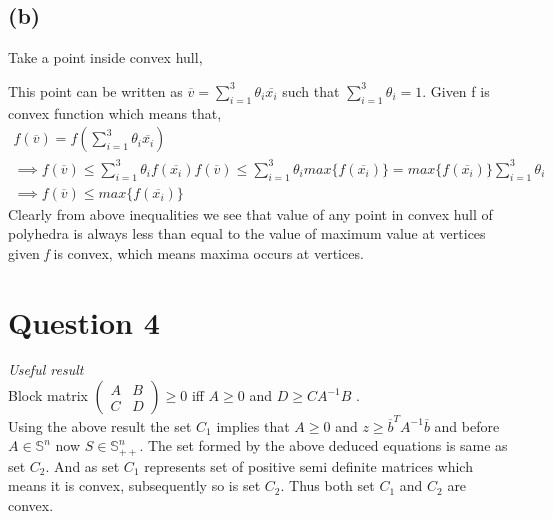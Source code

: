 \documentclass{article}
\begin{document}
\subsection*{(b)}
Take a point inside convex hull,
\begin{figure}[H]
    \centering


\end{figure}
This point can be written as $\overline{v}=\sum_{i=1}^{3}{\theta _i}\overline{x_i}$ such that $\sum_{i=1}^{3}{\theta _i} = 1$. Given f is convex function which means that,\\
\begin{gather*}
	f(\overline{v}) = f(\sum_{i=1}^{3}{\theta _i}\overline{x_i})\\
	\implies f(\overline{v}) \le \sum_{i=1}^{3}{\theta _i}f(\overline{x_i})
	f(\overline{v}) \le \sum_{i=1}^{3}{\theta _i}max\{f(\overline{x_i})\} = max\{f(\overline{x_i})\}\sum_{i=1}^{3}{\theta _i}\\
	\implies f(\overline{v}) \le max\{f(\overline{x_i})\}
\end{gather*}
Clearly from above inequalities we see that value of any point in convex hull of polyhedra is always less than equal to the value of maximum value at vertices given \textit{f} is convex, which means maxima occurs at vertices.
\section*{\hfil Question 4}
\textit{Useful result}\\
Block matrix $\begin{pmatrix} A & B \\ C & D\end{pmatrix} \ge 0$ iff $A \ge 0$ and $D \ge C{A}^{-1}B$ .\\
Using the above result the set $C_1$ implies that $A \ge 0$ and $z \ge \overline{b}^TA^{-1}\overline{b}$ and before $A \in \mathbb{S}^n$ now $S \in \mathbb{S}_{++}^n$. The set formed by the above deduced equations is same as set $C_2$. And as set $C_1$ represents set of positive semi definite matrices which means it is convex, subsequently so is set $C_2$. Thus both set $C_1$ and $C_2$ are convex.
\end{document}
